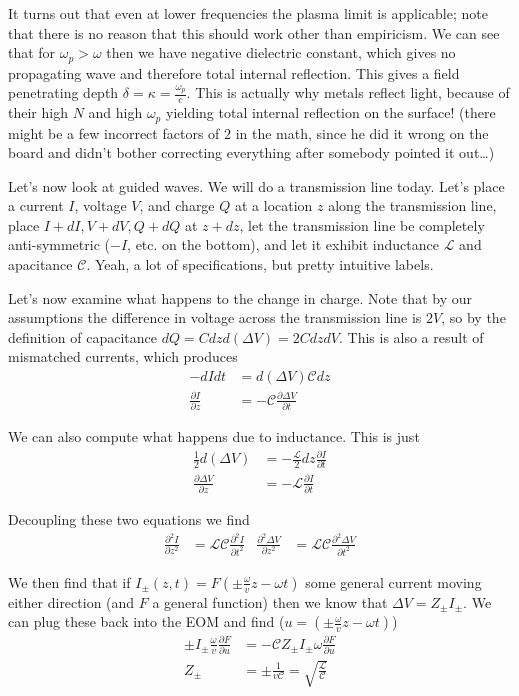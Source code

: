 \documentclass[10pt]{report}
\newcommand{\pd}[2]{\frac{\partial #1}{\partial#2}}
\newcommand{\ptd}[2]{\frac{\partial^2 #1}{\partial#2^2}}
\begin{document}
\begin{itemize}
        It turns out that even at lower frequencies the plasma limit is applicable; note that there is no reason that this should work other than empiricism. We can see that for $\omega_p > \omega$ then we have negative dielectric constant, which gives no propagating wave and therefore total internal reflection. This gives a field penetrating depth $\delta = \kappa = \frac{\omega_p}{c}$. This is actually why metals reflect light, because of their high $N$ and high $\omega_p$ yielding total internal reflection on the surface! (there might be a few incorrect factors of $2$ in the math, since he did it wrong on the board and didn't bother correcting everything after somebody pointed it out\dots)
\end{itemize}

Let's now look at guided waves. We will do a transmission line today. Let's place a current $I$, voltage $V$, and charge $Q$ at a location $z$ along the transmission line, place $I + dI, V+dV, Q+dQ$ at $z + dz$, let the transmission line be completely anti-symmetric ($-I$, etc. on the bottom), and let it exhibit inductance $\mathcal{L}$ and apacitance $\mathcal{C}$. Yeah, a lot of specifications, but pretty intuitive labels.

Let's now examine what happens to the change in charge. Note that by our assumptions the difference in voltage across the transmission line is $2V$, so by the definition of capacitance $dQ =Cdz d(\Delta V) = 2CdzdV$. This is also a result of mismatched currents, which produces 
\begin{align}
    -dI dt &= d(\Delta V) \mathcal{C} dz\\
    \pd{I}{z} &= -\mathcal{C}\pd{\Delta V}{t}
\end{align}

We can also compute what happens due to inductance. This is just
\begin{align}
    \frac{1}{2}d(\Delta V) &= -\frac{\mathcal{L}}{2} dz \pd{I}{t}\\
    \pd{\Delta V}{z} &= -\mathcal{L}\pd{I}{t}
\end{align}

Decoupling these two equations we find
\begin{align}
    \ptd{I}{z} &= \mathcal{L}\mathcal{C}\ptd{I}{t} & \ptd{\Delta V}{z} &= \mathcal{LC}\ptd{\Delta V}{t}
\end{align}

We then find that if $I_{\pm}(z,t) = F\left( \pm \frac{\omega}{v}z - \omega t \right)$ some general current moving either direction (and $F$ a general function) then we know that $\Delta V = Z_{\pm}I_\pm$. We can plug these back into the EOM and find ($u = \left( \pm \frac{\omega}{v}z - \omega t \right)$)
\begin{align}
    \pm I_{\pm}\frac{\omega}{v}\pd{F}{u} &= -\mathcal{C}Z_{\pm}I_{\pm}\omega \pd{F}{u}\\
    Z_{\pm} &= \pm \frac{1}{v\mathcal{C}} = \sqrt{\frac{\mathcal{L}}{\mathcal{C}}}
\end{align}
\end{document}
